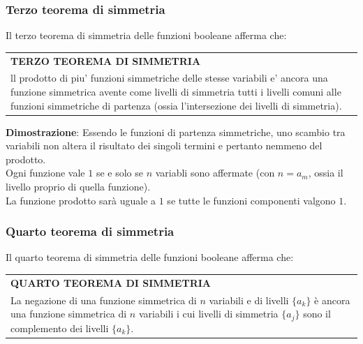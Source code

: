 \documentclass[a4paper]{extarticle}
\renewcommand\arraystretch{}
\begin{document}
\vspace{1em}
\noindent
\subsubsection{Terzo teorema di simmetria}
Il terzo teorema di simmetria delle funzioni booleane afferma che:

\vspace{1em}
\setlength{\tabcolsep}{14pt}
\renewcommand{\arraystretch}{2}
\noindent
\begin{tabularx}{\textwidth}{@{}|P|@{}}
    \hline
    {\textbf{TERZO TEOREMA DI SIMMETRIA}}\\
    \parbox{\linewidth}{ll prodotto di piu' funzioni simmetriche delle stesse variabili e' ancora una funzione simmetrica avente come livelli di simmetria tutti i livelli comuni alle funzioni simmetriche di partenza (ossia l'intersezione dei livelli di simmetria).\vspace{3mm}}\\
    \hline
\end{tabularx}

\vspace{1em}
\noindent
\textbf{Dimostrazione}: Essendo le funzioni di partenza simmetriche, uno scambio tra variabili non altera il risultato dei singoli termini e pertanto nemmeno del prodotto.\\
Ogni funzione vale $1$ se e solo se $n$ variabli sono
affermate (con $n = a_m$, ossia il livello proprio di quella funzione).\\
La funzione prodotto sarà uguale a $1$ se tutte le funzioni componenti valgono $1$.

\vspace{1em}
\noindent
\subsubsection{Quarto teorema di simmetria}
Il quarto teorema di simmetria delle funzioni booleane afferma che:

\vspace{1em}
\setlength{\tabcolsep}{14pt}
\renewcommand{\arraystretch}{2}
\noindent
\begin{tabularx}{\textwidth}{@{}|P|@{}}
    \hline
    {\textbf{QUARTO TEOREMA DI SIMMETRIA}}\\
    \parbox{\linewidth}{La negazione di una funzione simmetrica di $n$ variabili e di livelli $\{a_k\}$ è ancora una funzione simmetrica di $n$ variabili i cui livelli di simmetria $\{a_j\}$ sono il complemento dei livelli $\{a_k\}$.    
    \vspace{3mm}}\\
    \hline
\end{tabularx}
\end{document}
